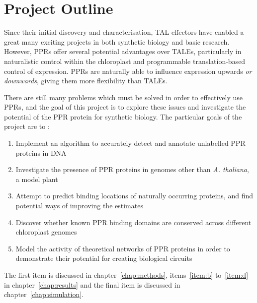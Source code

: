\section{Project Outline}

Since their initial discovery and characterisation, TAL effectors have enabled
a great many exciting projects in both synthetic biology and basic research.
However, PPRs offer several potential advantages over TALEs, particularly in 
naturalistic control within the chloroplast and programmable translation-based 
control of expression.
PPRs are naturally able to influence expression upwards \emph{or downwards},
giving them more flexibility than TALEs.

There are still many problems which must be solved in order to effectively use
PPRs, and the goal of this project is to explore these issues and investigate
the potential of the PPR protein for synthetic biology.
The particular goals of the project are to :
\begin{enumerate}
  \item \label{item:a}
    Implement an algorithm to accurately detect and annotate unlabelled PPR
    proteins in DNA
  \item \label{item:b}
    Investigate the presence of PPR proteins in genomes other than 
    \emph{A. thaliana}, a model plant
  \item \label{item:c}
    Attempt to predict binding locations of naturally occurring proteins, and
    find potential ways of improving the estimates
  \item \label{item:d}
    Discover whether known PPR binding domains are conserved across different 
    chloroplast genomes
  \item \label{item:e} 
    Model the activity of theoretical networks of PPR proteins in order to
    demonstrate their potential for creating biological circuits
\end{enumerate}

The first item is discussed in chapter~\ref{chap:methods}, items~\ref{item:b}
to~\ref{item:d} in chapter~\ref{chap:results} and the final item is discussed
in chapter~\ref{chap:simulation}.

